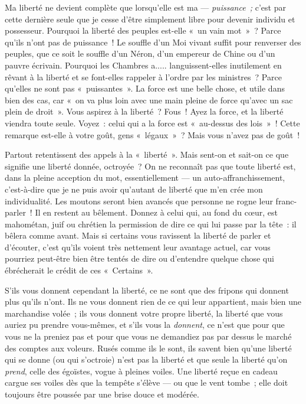 \documentclass[french,twoside]{book} %
\begin{document}
Ma liberté ne devient complète que lorsqu’elle est ma — \emph{puissance ;} c’est par cette dernière seule que je cesse d’être simplement libre pour devenir individu et possesseur. Pourquoi la liberté des peuples est-elle « un vain mot » ? Parce qu’ils n’ont pas de puissance ! Le souffle d’un Moi vivant suffit pour renverser des peuples, que ce soit le souffle d’un Néron, d’un empereur de Chine ou d’un pauvre écrivain. Pourquoi les Chambres a..... languissent-elles inutilement en rêvant à la liberté et se font-elles rappeler à l’ordre par les ministres ? Parce qu’elles ne sont pas « puissantes ». La force est une belle chose, et utile dans bien des cas, car « on va plus loin avec une main pleine de force qu’avec un sac plein de droit ». Vous aspirez à la liberté ? Fous ! Ayez la force, et la liberté viendra toute seule. Voyez : celui qui a la force est « au-dessus des lois » ! Cette remarque est-elle à votre goût, gens « légaux » ? Mais vous n’avez pas de goût !\par
Partout retentissent des appels à la « liberté ». Mais sent-on et sait-on ce que signifie une liberté donnée, octroyée ? On ne reconnaît pas que toute liberté est, dans la pleine acception du mot, essentiellement — un auto-affranchissement, c’est-à-dire que je ne puis avoir qu’autant de liberté que m’en crée mon individualité. Les moutons seront bien avancés que personne ne rogne leur franc-parler ! Il en restent au bêlement. Donnez à celui qui, au fond du cœur, est mahométan, juif ou chrétien la permission de dire ce qui lui passe par la tête : il bêlera comme avant. Mais si certains vous ravissent la liberté de parler et d’écouter, c’est qu’ils voient très nettement leur avantage actuel, car vous pourriez peut-être bien être  tentés de dire ou d’entendre quelque chose qui ébrécherait le crédit de ces « Certains ».\par
S’ils vous donnent cependant la liberté, ce ne sont que des fripons qui donnent plus qu’ils n’ont. Ils ne vous donnent rien de ce qui leur appartient, mais bien une marchandise volée ; ils vous donnent votre propre liberté, la liberté que vous auriez pu prendre vous-mêmes, et s’ils vous la \emph{donnent}, ce n’est que pour que vous ne la preniez pas et pour que vous ne demandiez pas par dessus le marché des comptes aux voleurs. Rusés comme ils le sont, ils savent bien qu’une liberté qui se donne (ou qui s’octroie) n’est pas la liberté et que seule la liberté qu’on \emph{prend}, celle des égoïstes, vogue à pleines voiles. Une liberté reçue en cadeau cargue ses voiles dès que la tempête s’élève — ou que le vent tombe ; elle doit toujours être poussée par une brise douce et modérée.\par
\end{document}
